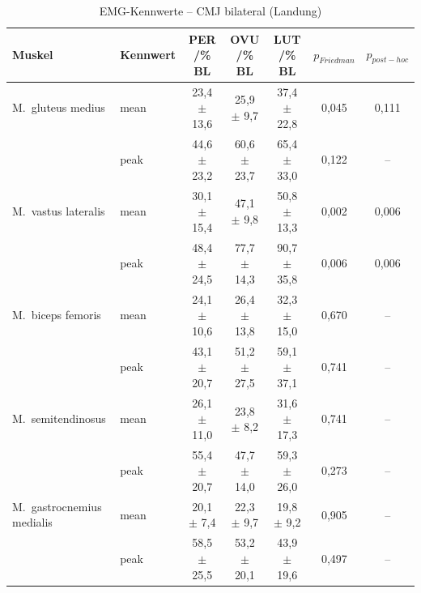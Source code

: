 
\begin{table}[H]
  \centering
  \caption{EMG-Kennwerte – CMJ bilateral (Landung)}
  \label{tab:CMJ_bilateral_Landung}
  \small
  \begin{tabular}{l l c c c c c }
    \hline
\textbf{Muskel} & \textbf{Kennwert} & \textbf{PER /\% BL} & \textbf{OVU /\% BL} & \textbf{LUT /\% BL} & \textbf{$p_{Friedman}$} & \textbf{$p_{post-hoc}$} \\
    \hline
    M.~gluteus medius & mean & 23{,}4 $\pm$ 13{,}6 & 25{,}9 $\pm$ 9{,}7 & 37{,}4 $\pm$ 22{,}8 & 0{,}045 & 0{,}111\\
     & peak & 44{,}6 $\pm$ 23{,}2 & 60{,}6 $\pm$ 23{,}7 & 65{,}4 $\pm$ 33{,}0 & 0{,}122 & --\\
    \hline
    M.~vastus lateralis & mean & 30{,}1 $\pm$ 15{,}4 & 47{,}1 $\pm$ 9{,}8 & 50{,}8 $\pm$ 13{,}3 & 0{,}002 & 0{,}006\\
     & peak & 48{,}4 $\pm$ 24{,}5 & 77{,}7 $\pm$ 14{,}3 & 90{,}7 $\pm$ 35{,}8 & 0{,}006 & 0{,}006\\
    \hline
    M.~biceps femoris & mean & 24{,}1 $\pm$ 10{,}6 & 26{,}4 $\pm$ 13{,}8 & 32{,}3 $\pm$ 15{,}0 & 0{,}670 & --\\
     & peak & 43{,}1 $\pm$ 20{,}7 & 51{,}2 $\pm$ 27{,}5 & 59{,}1 $\pm$ 37{,}1 & 0{,}741 & --\\
    \hline
    M.~semitendinosus & mean & 26{,}1 $\pm$ 11{,}0 & 23{,}8 $\pm$ 8{,}2 & 31{,}6 $\pm$ 17{,}3 & 0{,}741 & --\\
     & peak & 55{,}4 $\pm$ 20{,}7 & 47{,}7 $\pm$ 14{,}0 & 59{,}3 $\pm$ 26{,}0 & 0{,}273 & --\\
    \hline
    M.~gastrocnemius medialis & mean & 20{,}1 $\pm$ 7{,}4 & 22{,}3 $\pm$ 9{,}7 & 19{,}8 $\pm$ 9{,}2 & 0{,}905 & --\\
     & peak & 58{,}5 $\pm$ 25{,}5 & 53{,}2 $\pm$ 20{,}1 & 43{,}9 $\pm$ 19{,}6 & 0{,}497 & --\\
    \hline
  \end{tabular}
\end{table}

